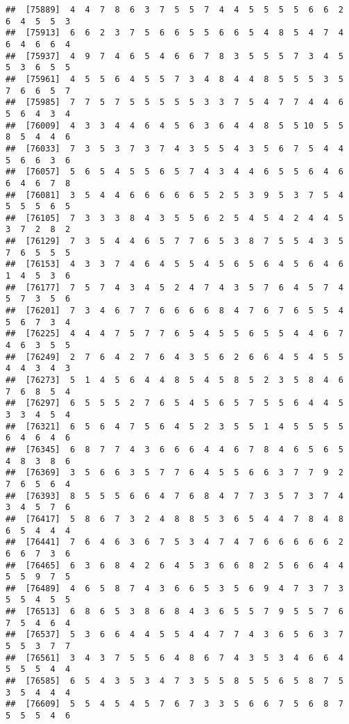 \documentclass[
]{book}
\begin{document}
\begin{verbatim}
##  [75889]  4  4  7  8  6  3  7  5  5  7  4  4  5  5  5  5  6  6  2  6  4  5  5  3
##  [75913]  6  6  2  3  7  5  6  6  5  5  6  6  5  4  8  5  4  7  4  6  4  6  6  4
##  [75937]  4  9  7  4  6  5  4  6  6  7  8  3  5  5  5  7  3  4  5  5  3  6  5  5
##  [75961]  4  5  5  6  4  5  5  7  3  4  8  4  4  8  5  5  5  3  5  7  6  6  5  7
##  [75985]  7  7  5  7  5  5  5  5  5  3  3  7  5  4  7  7  4  4  6  5  6  4  3  4
##  [76009]  4  3  3  4  4  6  4  5  6  3  6  4  4  8  5  5 10  5  5  8  5  4  4  6
##  [76033]  7  3  5  3  7  3  7  4  3  5  5  4  3  5  6  7  5  4  4  5  6  6  3  6
##  [76057]  5  6  5  4  5  5  6  5  7  4  3  4  4  6  5  5  6  4  6  6  4  6  7  8
##  [76081]  3  5  4  4  6  6  6  6  6  5  2  5  3  9  5  3  7  5  4  5  5  5  6  5
##  [76105]  7  3  3  3  8  4  3  5  5  6  2  5  4  5  4  2  4  4  5  3  7  2  8  2
##  [76129]  7  3  5  4  4  6  5  7  7  6  5  3  8  7  5  5  4  3  5  7  6  5  5  5
##  [76153]  4  3  3  7  4  6  4  5  5  4  5  6  5  6  4  5  6  4  6  1  4  5  3  6
##  [76177]  7  5  7  4  3  4  5  2  4  7  4  3  5  7  6  4  5  7  4  5  7  3  5  6
##  [76201]  7  3  4  6  7  7  6  6  6  6  8  4  7  6  7  6  5  5  4  5  6  7  3  4
##  [76225]  4  4  4  7  5  7  7  6  5  4  5  5  6  5  5  4  4  6  7  4  6  3  5  5
##  [76249]  2  7  6  4  2  7  6  4  3  5  6  2  6  6  4  5  4  5  5  4  4  3  4  3
##  [76273]  5  1  4  5  6  4  4  8  5  4  5  8  5  2  3  5  8  4  6  7  6  8  5  4
##  [76297]  6  5  5  5  2  7  6  5  4  5  6  5  7  5  5  6  4  4  5  3  3  4  5  4
##  [76321]  6  5  6  4  7  5  6  4  5  2  3  5  5  1  4  5  5  5  5  6  4  6  4  6
##  [76345]  6  8  7  7  4  3  6  6  6  4  4  6  7  8  4  6  5  6  5  4  8  3  8  6
##  [76369]  3  5  6  6  3  5  7  7  6  4  5  5  6  6  3  7  7  9  2  7  6  5  6  4
##  [76393]  8  5  5  5  6  6  4  7  6  8  4  7  7  3  5  7  3  7  4  3  4  5  7  6
##  [76417]  5  8  6  7  3  2  4  8  8  5  3  6  5  4  4  7  8  4  8  6  5  4  4  4
##  [76441]  7  6  4  6  3  6  7  5  3  4  7  4  7  6  6  6  6  6  2  6  6  7  3  6
##  [76465]  6  3  6  8  4  2  6  4  5  3  6  6  8  2  5  6  6  4  4  5  5  9  7  5
##  [76489]  4  6  5  8  7  4  3  6  6  5  3  5  6  9  4  7  3  7  3  5  5  4  5  5
##  [76513]  6  8  6  5  3  8  6  8  4  3  6  5  5  7  9  5  5  7  6  7  5  4  6  4
##  [76537]  5  3  6  6  4  4  5  5  4  4  7  7  4  3  6  5  6  3  7  5  5  3  7  7
##  [76561]  3  4  3  7  5  5  6  4  8  6  7  4  3  5  3  4  6  6  4  5  5  5  4  4
##  [76585]  6  5  4  3  5  3  4  7  3  5  5  8  5  5  6  5  8  7  5  3  5  4  4  4
##  [76609]  5  5  4  5  4  5  7  6  7  3  3  5  6  6  7  5  6  8  7  5  5  5  4  6

\end{verbatim}
\end{document}

